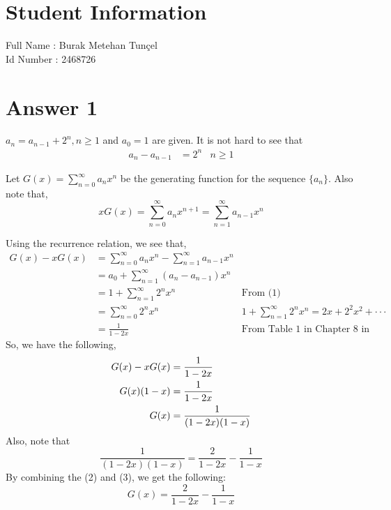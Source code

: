 \documentclass[12pt]{article}
\begin{document}
\section*{Student Information } 
Full Name :  Burak Metehan Tunçel \\
Id Number :  2468726 \\

\section*{Answer 1}
$a_n = a_{n-1} + 2^n, n\geq 1$ and $a_0 = 1$ are given. It is not hard to see that
\begin{align}
    a_n - a_{n-1} &= 2^n &n \geq 1
\end{align}

\noindent Let $G(x) = \sum_{n=0}^{\infty} a_nx^n$ be the generating function for the sequence $\{a_n\}$. Also note that,
\begin{equation*}
    x G(x) = \sum_{n=0}^{\infty} a_nx^{n+1} = \sum_{n=1}^{\infty} a_{n-1}x^{n}
\end{equation*}

\noindent Using the recurrence relation, we see that,
\begin{align*}
    G(x) - x G(x) &= \sum_{n=0}^{\infty} a_{n}x^{n} - \sum_{n=1}^{\infty} a_{n-1}x^{n}\\
    &= a_0 + \sum_{n=1}^{\infty} (a_n - a_{n-1})x^{n}\\
    &= 1 + \sum_{n=1}^{\infty} 2^nx^{n} &\text{From (1)}\\
    &= \sum_{n=0}^{\infty} 2^nx^n &1 + \sum_{n=1}^{\infty} 2^nx^{n} = 2x + 2^2x^2 + \cdot \cdot \cdot\\
    &= \frac{1}{1-2x} &\text{From Table 1 in Chapter 8 in textbook}
\end{align*}
So, we have the following,
\begin{align}
    G(x) - xG(x) &= \frac{1}{1-2x} \notag \\
    G(x) (1-x) &= \frac{1}{1-2x} \notag \\
    G(x) &= \frac{1}{(1-2x)(1-x)}
\end{align}
Also, note that
\begin{equation}
    \frac{1}{(1-2x)(1-x)} = \frac{2}{1-2x} - \frac{1}{1-x}
\end{equation}
By combining the (2) and (3), we get the following:
\begin{equation}
    G(x) = \frac{2}{1-2x} - \frac{1}{1-x}
\end{equation}
\end{document}
